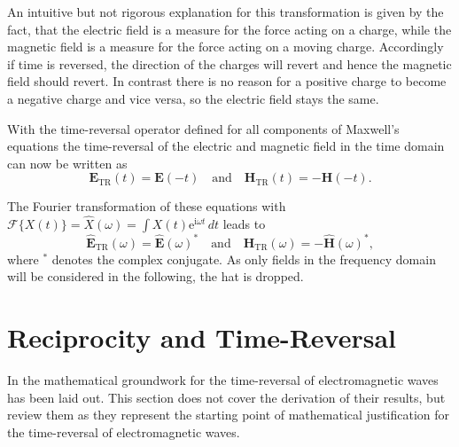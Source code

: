An intuitive but not rigorous explanation for this transformation is given by the fact, that the electric field is a measure for the force acting on a charge, while the magnetic field is a measure for the force acting on a moving charge. 
Accordingly if time is reversed, the direction of the charges will revert and hence the magnetic field should revert. 
In contrast there is no reason for a positive charge to become a negative charge and vice versa, so the electric field stays the same.

With the time-reversal operator defined for all components of Maxwell's equations the time-reversal of the electric and magnetic field in the time domain can now be written as
\begin{equation}
    \bm{E}_{\text{TR}}(t) = \bm{E}(-t) \quad \text{and} \quad \bm{H}_{\text{TR}}(t) = -\bm{H}(-t).
\end{equation}

The Fourier transformation of these equations with \(\mathcal{F}\{X(t)\} = \hat{X}(\omega) = \int X(t) \mathrm{e}^{\mathrm{i}\omega t} \, dt\) leads to
\begin{equation}
    \hat{\bm{E}}_{\text{TR}}(\omega) = \hat{\bm{E}}{(\omega)}^* \quad \text{and} \quad \hat{\bm{H}}_{\text{TR}}(\omega) = -\hat{\bm{H}}{(\omega)}^*,
\end{equation}
where \(^*\) denotes the complex conjugate. 
As only fields in the frequency domain will be considered in the following, the hat is dropped.



\section{Reciprocity and Time-Reversal}\label{sec:math_foundations_em_tr}
In \parencite{de_rosny_theory_2010} the mathematical groundwork for the time-reversal of electromagnetic waves has been laid out.
This section does not cover the derivation of their results, but review them as they represent the starting point of mathematical justification for the time-reversal of electromagnetic waves.

